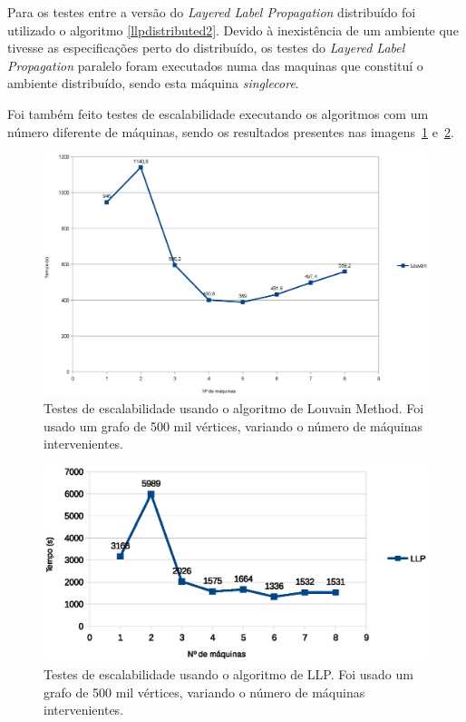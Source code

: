 Para os testes entre a versão do \textit{Layered Label Propagation} distribuído 
foi utilizado o algoritmo \ref{llpdistributed2}. Devido à inexistência de um 
ambiente que tivesse as especificações perto do distribuído, os testes do 
\textit{Layered Label Propagation} paralelo foram executados numa das maquinas 
que constituí o ambiente distribuído, sendo esta máquina \textit{singlecore}.

Foi também feito testes de escalabilidade executando os algoritmos com um 
número diferente de máquinas, sendo os resultados presentes nas 
imagens~\ref{louvainesc} e~\ref{llpesc}.

\begin{figure}
  \centering
  \includegraphics[width=\linewidth]{lov}
  \caption{Testes de escalabilidade usando o algoritmo de Louvain Method. 
  Foi usado um grafo de 500 mil vértices, variando o número de máquinas 
intervenientes.}
	\label{louvainesc}
\end{figure}

\begin{figure}
  \centering
  \includegraphics[width=\linewidth]{llp}
  \caption{Testes de escalabilidade usando o algoritmo de LLP. Foi 
usado um grafo de 500 mil vértices, variando o número de máquinas 
intervenientes.}
	\label{llpesc}
\end{figure}

